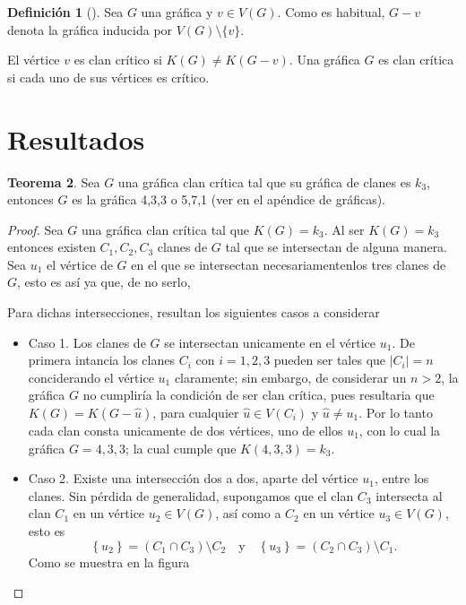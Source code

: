 \documentclass[12pt]{book}
\theoremstyle{definition}
\newtheorem{theorem}{Teorema}[chapter]
\newtheorem{definition}[theorem]{Definición}
\begin{document}
\begin{definition}[\citealt{Alcon:2006}]
Sea $G$ una gráfica y $v \in V(G)$. Como es habitual, $G-v$ denota la gráfica inducida por $V(G)\setminus \{v\}$.  

El vértice $v$ es clan crítico si $K(G)\neq K(G-v)$. Una gráfica $G$ es clan crítica si cada uno de sus vértices es crítico.
\end{definition}



\section*{Resultados}

\begin{theorem}
	Sea $G$ una gráfica clan crítica tal que su gráfica de clanes es $k_3$, entonces $G$ es la gráfica 4,3,3 o 5,7,1 (ver en \cite{Harary:1969} el apéndice de gráficas).
\end{theorem}
\begin{proof}
Sea $G$ una gráfica clan crítica tal que $K(G)=k_3$. Al ser $K(G)=k_3$ entonces existen $C_1,C_2,C_3$ clanes de $G$ tal que se intersectan de alguna manera.
Sea $u_1$ el vértice de $G$ en el que se intersectan necesariamentenlos tres clanes de $G$, esto es así ya que, de no serlo, %

Para dichas intersecciones, resultan los siguientes casos a considerar
\begin{itemize}
\item Caso 1. 
Los clanes de $G$ se intersectan unicamente en el vértice $u_1$. De primera intancia los clanes $C_i$ con $i=1,2,3$ pueden ser tales que $|C_i|=n$ conciderando el vértice $u_1$ claramente; sin embargo, de considerar un $n>2$, la gráfica $G$ no cumpliría la condición de ser clan crítica, pues resultaria que $K(G)=K(G-\hat{u})$, para cualquier $\hat{u}\in V(C_i)$ y $\hat{u}\neq u_1$. Por lo tanto cada clan consta unicamente de dos vértices, uno de ellos $u_1$, con lo cual la gráfica $G=4,3,3$; la cual cumple que $K(4,3,3)=k_3$.

\item Caso 2.
Existe una intersección dos a dos, aparte del vértice $u_1$, entre los clanes. Sin pérdida de generalidad, supongamos que el clan $C_3$ intersecta al clan $C_1$ en un vértice $u_2\in V(G)$, así como a $C_2$ en un vértice $u_3\in V(G)$, esto es 
\begin{equation*}
\left\{u_2\right\}=(C_1\cap C_3)\setminus C_2 \quad \text{y} \quad \left\{u_3\right\}=(C_2\cap C_3)\setminus C_1.
\end{equation*}
Como se muestra en la figura

\end{itemize}


\end{proof}













\end{document}
